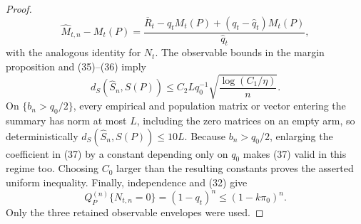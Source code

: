 \documentclass{article}
\begin{document}
\begin{proof}
\[
\widehat M_{t,n}-M_t(P)=
\frac{\overline R_t-q_tM_t(P)+(q_t-\widehat q_t)M_t(P)}{\widehat q_t},          \tag{36}
\]
with the analogous identity for \(N_t\).  The observable bounds in the margin proposition and (35)--(36) imply
\[
d_S(\widehat S_n,S(P))\le C_2Lq_0^{-1}
\sqrt{\frac{\log(C_1/\eta)}n}.                                                \tag{37}
\]
On \(\{b_n>q_0/2\}\), every empirical and population matrix or vector entering the summary has norm at most \(L\), including the zero matrices on an empty arm, so deterministically \(d_S(\widehat S_n,S(P))\le10L\).  Because \(b_n>q_0/2\), enlarging the coefficient in (37) by a constant depending only on \(q_0\) makes (37) valid in this regime too.  Choosing \(C_0\) larger than the resulting constants proves the asserted uniform inequality.  Finally, independence and (32) give
\[
Q_P^{(n)}\{N_{t,n}=0\}=(1-q_t)^n\le(1-k\pi_0)^n.
\]
Only the three retained observable envelopes were used.
\end{proof}
\end{document}
